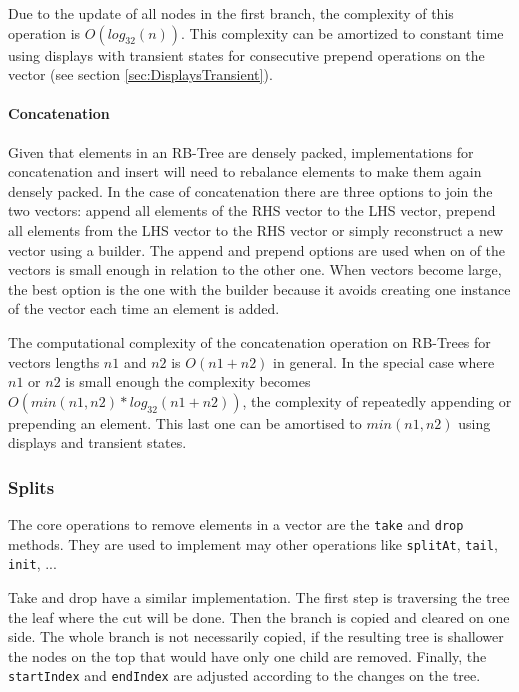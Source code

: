 Due to the update of all nodes in the first branch, the complexity of this operation is $O(log_{32}(n))$. This complexity can be amortized to constant time using displays with transient states for consecutive prepend operations on the vector (see section \ref{sec:DisplaysTransient}).


\paragraph{Concatenation}
Given that elements in an RB-Tree are densely packed, implementations for concatenation and insert will need to rebalance elements to make them again densely packed. In the case of concatenation there are three options to join the two vectors: append all elements of the RHS vector to the LHS vector, prepend all elements from the LHS vector to the RHS vector or simply reconstruct a new vector using a builder. The append and prepend options are used when on of the vectors is small enough in relation to the other one. When vectors become large, the best option is the one with the builder because it avoids creating one instance of the vector each time an element is added.

The computational complexity of the concatenation operation on RB-Trees for vectors lengths $n1$ and $n2$ is $O(n1 + n2)$ in general. In the special case where $n1$ or $n2$ is small enough the complexity becomes $O(min(n1,n2)*log_{32}(n1+n2))$, the complexity of repeatedly appending or prepending an element. This last one can be amortised to $min(n1,n2)$ using displays and transient states. 


\subsubsection{Splits}
The core operations to remove elements in a vector are the \texttt{take} and \texttt{drop} methods. They are used to implement may other operations like \texttt{splitAt}, \texttt{tail}, \texttt{init}, ...

Take and drop have a similar implementation. The first step is traversing the tree the leaf where the cut will be done. Then the branch is copied and cleared on one side. The whole branch is not necessarily copied, if the resulting tree is shallower the nodes on the top that would have only one child are removed. Finally, the \texttt{startIndex} and \texttt{endIndex} are adjusted according to the changes on the tree.

